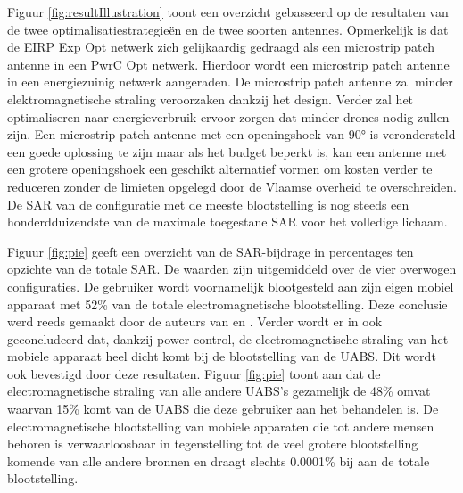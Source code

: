 \documentclass[twocolumn]{phdsymp_dutch}
\begin{document}
Figuur \ref{fig:resultIllustration} toont een overzicht gebasseerd op de resultaten van de twee optimalisatiestrategieën en de twee soorten antennes.
Opmerkelijk is dat de \gls{EIRP} \gls{Exp Opt} netwerk zich gelijkaardig gedraagd als een microstrip patch antenne in een \gls{PwrC Opt} netwerk.
Hierdoor wordt een microstrip patch antenne in een energiezuinig netwerk aangeraden. De microstrip patch antenne zal minder elektromagnetische straling veroorzaken dankzij het design.
Verder zal het optimaliseren naar energieverbruik ervoor zorgen dat minder drones nodig zullen zijn.
Een microstrip patch antenne met een openingshoek van \ang{90} is verondersteld een goede oplossing te zijn
 maar als het budget beperkt is, kan een antenne met een grotere openingshoek een geschikt alternatief vormen
 om kosten verder te reduceren zonder de limieten opgelegd door de Vlaamse overheid te overschreiden.
De \gls{SAR} van de configuratie met de meeste blootstelling is nog steeds een honderdduizendste van de maximale toegestane \gls{SAR} voor het volledige lichaam.

Figuur \ref{fig:pie} geeft een overzicht van de \gls{SAR}-bijdrage in percentages ten opzichte van de totale \gls{SAR}.
De waarden zijn uitgemiddeld over de vier overwogen configuraties.
De gebruiker wordt voornamelijk blootgesteld aan zijn eigen mobiel apparaat met 
52\% van de totale electromagnetische blootstelling.
Deze conclusie werd reeds gemaakt door de auteurs van 
\cite{J17_kuehn2019modelling} en  \cite{J10.1.1}.
Verder wordt er in \cite{J10.1.1} ook geconcludeerd dat, dankzij power control, 
de electromagnetische straling van het mobiele apparaat heel dicht komt bij de blootstelling van de \gls{UABS}.
Dit wordt ook bevestigd door deze resultaten. Figuur \ref{fig:pie} toont aan dat de electromagnetische straling van 
alle andere \gls{UABS}'s  gezamelijk de 48\% omvat waarvan 15\% komt van de \gls{UABS} die deze gebruiker aan het behandelen is.
De electromagnetische blootstelling van mobiele apparaten die tot andere mensen behoren 
is verwaarloosbaar in tegenstelling tot de veel grotere blootstelling komende van alle andere bronnen
en draagt slechts 0.0001\% bij aan de totale blootstelling.
\end{document}
